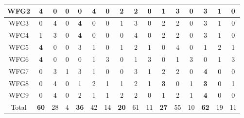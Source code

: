 \begin{table}[h]
{\begin{tabular}{|c|c|c|c|c|c|c|c|c|c|c|c|c|c|c|c|}
WFG2 & \textbf{4} & 0 & 0 & 0 & 4 & 0 & 2 & 2 & 0 & 1 & 3 & 0 & 3 & 1 & 0 \\ \hline
WFG3 & 0 & 4 & 0 & \textbf{4} & 0 & 0 & 1 & 3 & 0 & 2 & 2 & 0 & 3 & 1 & 0 \\ \hline
WFG4 & 1 & 3 & 0 & \textbf{4} & 0 & 0 & 0 & 4 & 0 & 2 & 2 & 0 & 3 & 1 & 0 \\ \hline
WFG5 & \textbf{4} & 0 & 0 & 3 & 1 & 0 & 1 & 2 & 1 & 0 & 4 & 0 & 1 & 2 & 1 \\ \hline
WFG6 & \textbf{4} & 0 & 0 & 0 & 1 & 3 & 0 & 1 & 3 & 0 & 1 & 3 & 0 & 1 & 3 \\ \hline
WFG7 & 0 & 3 & 1 & 3 & 1 & 0 & 0 & 3 & 1 & 2 & 2 & 0 & \textbf{4} & 0 & 0 \\ \hline
WFG8 & 0 & 4 & 0 & 1 & 2 & 1 & 1 & 2 & 1 & \textbf{3} & 0 & 1 & \textbf{3} & 0 & 1 \\ \hline
WFG9 & 0 & 4 & 0 & 2 & 1 & 1 & 2 & 2 & 0 & 1 & 2 & 1 & \textbf{4} & 0 & 0 \\ \hline
Total & \textbf{60} & 28 & 4 & \textbf{36} & 42 & 14 & \textbf{20} & 61 & 11 & \textbf{27} & 55 & 10 & \textbf{62} & 19 & 11 \\ \hline
\end{tabular}%
}
\end{table}

